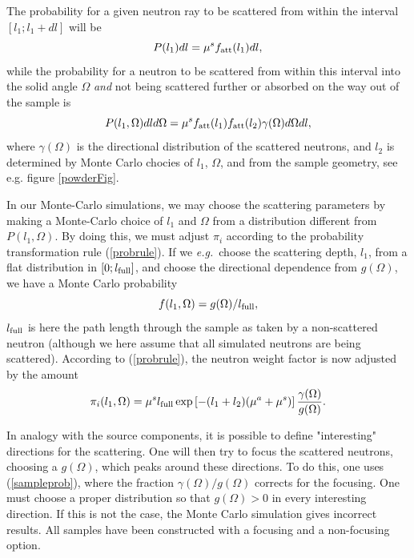 The probability for a given neutron ray to be scattered from within the interval
$[ l_1 ; l_1+dl ]$ will be
\begin{equation}
P(l_1) dl = \mu^s f_{\rm att}(l_1) dl ,
\end{equation}
while the probability for a neutron to be scattered from within
this interval into the solid angle $\Omega$ {\em and}
not being scattered further
or absorbed on the way out of the sample is
\begin{equation}
P(l_1,\Omega) dl d\Omega =
  \mu^s f_{\rm att}(l_1) f_{\rm att}(l_2) \gamma(\Omega) d\Omega dl ,
\end{equation}
where $\gamma(\Omega)$ is the directional distribution
of the scattered neutrons, and $l_2$ is determined by
Monte Carlo chocies of $l_1$, $\Omega$,
and from the sample geometry, see e.g. figure \ref{powderFig}.

In our Monte-Carlo simulations, we may choose the scattering
parameters by making a Monte-Carlo choice of $l_1$ and $\Omega$
from a distribution different from $P(l_1,\Omega)$.
By doing this, we must adjust $\pi_i$ according to
the probability transformation rule (\ref{probrule}).
If we {\em e.g.}\ choose the scattering depth, $l_1$,
from a flat distribution in $[ 0 ; l_{\rm full} ]$,
and choose the directional dependence from $g(\Omega)$,
we have a Monte Carlo probability
\begin{equation}
f(l_1,\Omega) = g(\Omega) / l_{\rm full} ,
\end{equation}
$l_{\rm full}$ is here the path length through the sample
as taken by a non-scattered neutron (although we here
assume that all simulated neutrons are being scattered).
According to (\ref{probrule}), the neutron weight factor
is now adjusted by the amount
\begin{equation}     \label{sampleprob}
\pi_i(l_1,\Omega) =
 \mu^s l_{\rm full} \exp \left[ - (l_1+l_2) (\mu^a + \mu^s) \right]
  \frac{\gamma(\Omega)}{g(\Omega)} .
\end{equation}

In analogy with the source components, it is possible to define
"interesting" directions for the scattering.
One will then try to focus the scattered neutrons,
choosing a $g(\Omega)$, which peaks around these directions.
To do this, one uses (\ref{sampleprob}), where the
fraction $\gamma(\Omega)/g(\Omega)$ corrects for the focusing.
One must choose a proper distribution so that
$g(\Omega) > 0$ in every interesting direction. If this is not the
case, the Monte Carlo simulation gives incorrect results.
All samples have been constructed with a focusing
and a non-focusing option.


